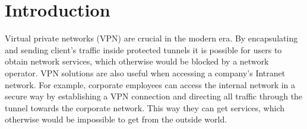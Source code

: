 \section{Introduction}
\label{section:introduction}

Virtual private networks (VPN) are crucial in the modern era. 
By encapsulating and sending client's traffic inside protected 
tunnels it is possible for users to obtain network services, 
which otherwise would be blocked by a network operator. VPN 
solutions are also useful when accessing a company’s Intranet 
network. For example, corporate employees can access the 
internal network in a secure way by establishing a VPN connection 
and directing all traffic through the tunnel towards the corporate 
network. This way they can get services, which otherwise would 
be impossible to get from the outside world.